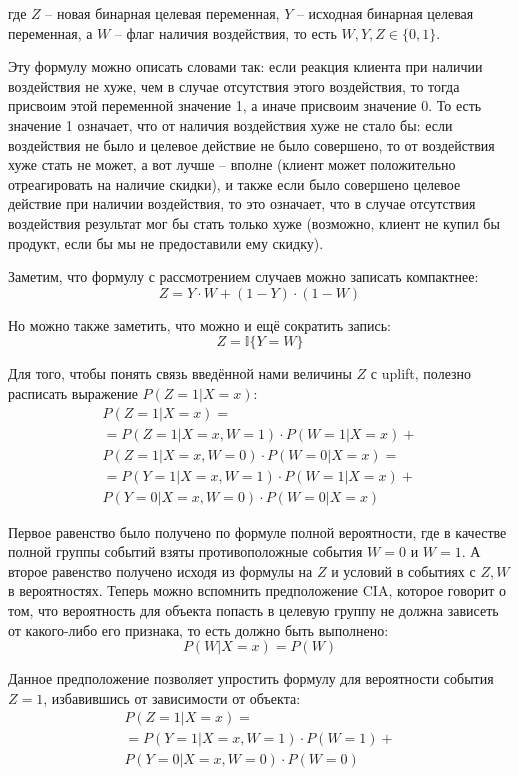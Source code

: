 где $Z$ -- новая бинарная целевая переменная, $Y$ -- исходная бинарная целевая переменная, а $W$ -- флаг наличия воздействия, то есть $W, Y, Z \in \{0, 1\}$.

Эту формулу можно описать словами так: если реакция клиента при наличии воздействия не хуже, чем в случае отсутствия этого воздействия, то тогда присвоим этой переменной значение 1, а иначе присвоим значение 0. То есть значение 1 означает, что от наличия воздействия хуже не стало бы: если воздействия не было и целевое действие не было совершено, то от воздействия хуже стать не может, а вот лучше -- вполне (клиент может положительно отреагировать на наличие скидки), и также если было совершено целевое действие при наличии воздействия, то это означает, что в случае отсутствия воздействия результат мог бы стать только хуже (возможно, клиент не купил бы продукт, если бы мы не предоставили ему скидку).

Заметим, что формулу с рассмотрением случаев можно записать компактнее:
$$
    Z = Y \cdot W + (1 - Y) \cdot (1 - W)
$$

Но можно также заметить, что можно и ещё сократить запись:
$$
    Z = \mathbb{I}\{Y = W\}
$$

Для того, чтобы понять связь введённой нами величины $Z$ с uplift, полезно расписать выражение $P(Z=1 | X = x)$:
\begin{multline*}
    P(Z=1 | X = x) = \\
    = P(Z = 1 | X = x, W = 1) \cdot P(W = 1 | X = x) + \\
    P(Z = 1 | X = x, W = 0) \cdot P(W = 0 | X = x) = \\
    = P(Y = 1 | X = x, W = 1) \cdot P(W = 1 | X = x) + \\
    P(Y = 0 | X = x, W = 0) \cdot P(W = 0 | X = x)
\end{multline*}

Первое равенство было получено по формуле полной вероятности, где в качестве полной группы событий взяты противоположные события $W=0$ и $W=1$. А второе равенство получено исходя из формулы на $Z$ и условий в событиях с $Z, W$ в вероятностях. Теперь можно вспомнить предположение CIA, которое говорит о том, что вероятность для объекта попасть в целевую группу не должна зависеть от какого-либо его признака, то есть должно быть выполнено:
$$
    P(W | X = x) = P(W)
$$

Данное предположение позволяет упростить формулу для вероятности события $Z=1$, избавившись от зависимости от объекта:
\begin{multline*}
    P(Z=1 | X = x) = \\
    = P(Y = 1 | X = x, W = 1) \cdot P(W = 1) + \\
    P(Y = 0 | X = x, W = 0) \cdot P(W = 0)
\end{multline*}

